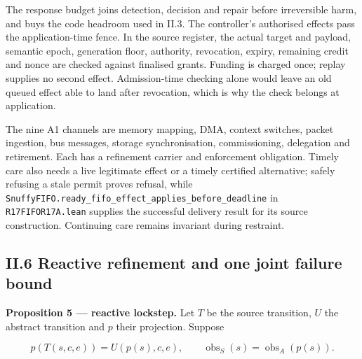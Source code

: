 \documentclass[
]{article}
\begin{document}
The response budget joins detection, decision and repair before
irreversible harm, and buys the code headroom used in II.3. The
controller's authorised effects pass the application-time fence. In the
source register, the actual target and payload, semantic epoch,
generation floor, authority, revocation, expiry, remaining credit and
nonce are checked against finalised grants. Funding is charged once;
replay supplies no second effect. Admission-time checking alone would
leave an old queued effect able to land after revocation, which is why
the check belongs at application.

The nine A1 channels are memory mapping, DMA, context switches, packet
ingestion, bus messages, storage synchronisation, commissioning,
delegation and retirement. Each has a refinement carrier and enforcement
obligation. Timely care also needs a live legitimate effect or a timely
certified alternative; safely refusing a stale permit proves refusal,
while
\texttt{S\allowbreak{}n\allowbreak{}u\allowbreak{}f\allowbreak{}f\allowbreak{}y\allowbreak{}F\allowbreak{}I\allowbreak{}F\allowbreak{}O\allowbreak{}.\allowbreak{}r\allowbreak{}e\allowbreak{}a\allowbreak{}d\allowbreak{}y\allowbreak{}\_\allowbreak{}f\allowbreak{}i\allowbreak{}f\allowbreak{}o\allowbreak{}\_\allowbreak{}e\allowbreak{}f\allowbreak{}f\allowbreak{}e\allowbreak{}c\allowbreak{}t\allowbreak{}\_\allowbreak{}a\allowbreak{}p\allowbreak{}p\allowbreak{}l\allowbreak{}i\allowbreak{}e\allowbreak{}s\allowbreak{}\_\allowbreak{}b\allowbreak{}e\allowbreak{}f\allowbreak{}o\allowbreak{}r\allowbreak{}e\allowbreak{}\_\allowbreak{}d\allowbreak{}e\allowbreak{}a\allowbreak{}d\allowbreak{}l\allowbreak{}i\allowbreak{}n\allowbreak{}e}
in \texttt{R17FIFOR17A.lean} supplies the successful delivery result for
its source construction. Continuing care remains invariant during
restraint.

\subsection{II.6 Reactive refinement and one joint failure
bound}\label{ii.6-reactive-refinement-and-one-joint-failure-bound}

\textbf{Proposition 5 --- reactive lockstep.} Let \(T\) be the source
transition, \(U\) the abstract transition and \(p\) their projection.
Suppose

\[
p(T(s,c,e))=U(p(s),c,e),
\qquad\operatorname{obs}_S(s)=\operatorname{obs}_A(p(s)).
\]
\end{document}
